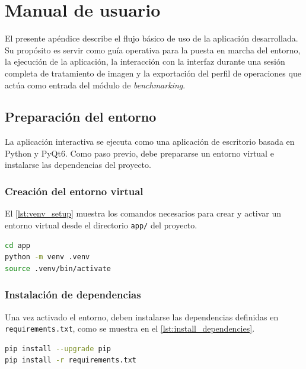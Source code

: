 
\section{Manual de usuario} \label{sec:appendix_A_user_manual}

El presente apéndice describe el flujo básico de uso de la aplicación
desarrollada. Su propósito es servir como
guía operativa para la puesta en marcha del entorno, la ejecución de la
aplicación, la interacción con la interfaz durante una sesión completa de
tratamiento de imagen y la exportación del perfil de operaciones que actúa como
entrada del módulo de \textit{benchmarking}.

\subsection{Preparación del entorno}

La aplicación interactiva se ejecuta como una aplicación de escritorio basada en
Python y PyQt6. Como paso previo, debe prepararse un entorno virtual e instalarse
las dependencias del proyecto.

\subsubsection{Creación del entorno virtual}

El \autoref{lst:venv_setup} muestra los comandos necesarios para crear y activar un
entorno virtual desde el directorio \texttt{app/} del proyecto.

\begin{lstlisting}[language=bash, caption={Creación y activación del entorno virtual}, label={lst:venv_setup}]
cd app
python -m venv .venv
source .venv/bin/activate
\end{lstlisting}

\subsubsection{Instalación de dependencias}

Una vez activado el entorno, deben instalarse las dependencias definidas
en \texttt{requirements.txt}, como se muestra en el \autoref{lst:install_dependencies}.

\begin{lstlisting}[language=bash, caption={Instalación de dependencias de la aplicación}, label={lst:install_dependencies}]
pip install --upgrade pip
pip install -r requirements.txt
\end{lstlisting}

